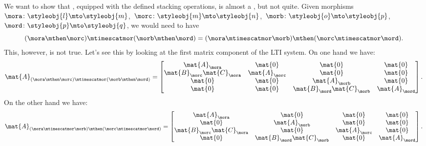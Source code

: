 \begin{example}
    We want to show that \LTI, equipped with the defined stacking operations, is almost a , but not quite.
    Given morphisms~$\mora\colon \styleobj{l}\mto \styleobj{m}$,~$\morc\colon \styleobj{m}\mto \styleobj{n}$,~$\morb\colon \styleobj{o}\mto \styleobj{p}$,~$\mord\colon \styleobj{p}\mto \styleobj{q}$, we would need to have
    \begin{equation*}
        (\mora \mthen \morc)
        \mtimescatmor (\morb\mthen \mord)=(\mora\mtimescatmor \morb)\mthen (\morc\mtimescatmor \mord).
    \end{equation*}
    This, however, is not true.
    Let's see this by looking at the first matrix component of the LTI system.
    On one hand we have:
    \begin{equation}\label{eq:checking-LTI-functorial-stacking-1}
        \mat{A}_{(\mora \mthen \morc)\mtimescatmor (\morb\mthen \mord)}=
        \begin{bmatrix}
            \mat{A}_\mora              & \mat{0}       & \mat{0}                    & \mat{0}       \\
            \mat{B}_\morc\mat{C}_\mora & \mat{A}_\morc & \mat{0}                    & \mat{0}       \\
            \mat{0}                    & \mat{0}       & \mat{A}_\morb              & \mat{0}       \\
            \mat{0}                    & \mat{0}       & \mat{B}_\mord\mat{C}_\morb & \mat{A}_\mord
        \end{bmatrix}.
    \end{equation}
    On the other hand we have:
    \begin{equation}\label{eq:checking-LTI-functorial-stacking-2}
        \mat{A}_{(\mora\mtimescatmor \morb)\mthen (\morc\mtimescatmor \mord)}=
        \begin{bmatrix}
            \mat{A}_\mora               & \mat{0}                     & \mat{0}       & \mat{0}       \\
            \mat{0}                     & \mat{A}_\morb               & \mat{0}       & \mat{0}       \\
            \mat{B}_\morc \mat{C}_\mora & \mat{0}                     & \mat{A}_\morc & \mat{0}       \\
            \mat{0}                     & \mat{B}_\mord \mat{C}_\morb & \mat{0}       & \mat{A}_\mord
        \end{bmatrix}.
    \end{equation}

\end{example}
